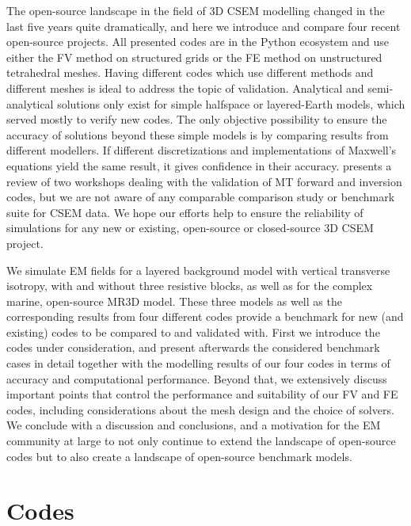 \documentclass[
    paper,
  ]{geophysics}
\begin{document}
The open-source landscape in the field of 3D CSEM modelling changed in the last five years quite dramatically, and here we introduce and compare four recent open-source projects. All presented codes are in the Python ecosystem and use either the FV method on structured grids or the FE method on unstructured tetrahedral meshes. Having different codes which use different methods and different meshes is ideal to address the topic of validation. Analytical and semi-analytical solutions only exist for simple halfspace or layered-Earth models, which served mostly to verify new codes. The only objective possibility to ensure the accuracy of solutions beyond these simple models is by comparing results from different modellers. If different discretizations and implementations of Maxwell's equations yield the same result, it gives confidence in their accuracy. \cite{GJI.13.Miensopust} presents a review of two workshops dealing with the validation of MT forward and inversion codes, but we are not aware of any comparable comparison study or benchmark suite for CSEM data. We hope our efforts help to ensure the reliability of simulations for any new or existing, open-source or closed-source 3D CSEM project.

We simulate EM fields for a layered background model with vertical transverse isotropy, with and without three resistive blocks, as well as for the complex marine, open-source MR3D model. These three models as well as the corresponding results from four different codes provide a benchmark for new (and existing) codes to be compared to and validated with. First we introduce the codes under consideration, and present afterwards the considered benchmark cases in detail together with the modelling results of our four codes in terms of accuracy and computational performance. Beyond that, we extensively discuss important points that control the performance and suitability of our FV and FE codes, including considerations about the mesh design and the choice of solvers. We conclude with a discussion and conclusions, and a motivation for the EM community at large to not only continue to extend the landscape of open-source codes but to also create a landscape of open-source benchmark models.

\section{Codes}
\end{document}
